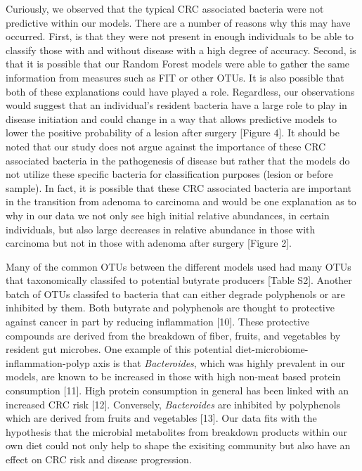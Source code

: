 \documentclass[12pt,]{article}
\begin{document}
Curiously, we observed that the typical CRC associated bacteria were not
predictive within our models. There are a number of reasons why this may
have occurred. First, is that they were not present in enough
individuals to be able to classify those with and without disease with a
high degree of accuracy. Second, is that it is possible that our Random
Forest models were able to gather the same information from measures
such as FIT or other OTUs. It is also possible that both of these
explanations could have played a role. Regardless, our observations
would suggest that an individual's resident bacteria have a large role
to play in disease initiation and could change in a way that allows
predictive models to lower the positive probability of a lesion after
surgery {[}Figure 4{]}. It should be noted that our study does not argue
against the importance of these CRC associated bacteria in the
pathogenesis of disease but rather that the models do not utilize these
specific bacteria for classification purposes (lesion or before sample).
In fact, it is possible that these CRC associated bacteria are important
in the transition from adenoma to carcinoma and would be one explanation
as to why in our data we not only see high initial relative abundances,
in certain individuals, but also large decreases in relative abundance
in those with carcinoma but not in those with adenoma after surgery
{[}Figure 2{]}.

Many of the common OTUs between the different models used had many OTUs
that taxonomically classifed to potential butyrate producers {[}Table
S2{]}. Another batch of OTUs classifed to bacteria that can either
degrade polyphenols or are inhibited by them. Both butyrate and
polyphenols are thought to protective against cancer in part by reducing
inflammation {[}10{]}. These protective compounds are derived from the
breakdown of fiber, fruits, and vegetables by resident gut microbes. One
example of this potential diet-microbiome-inflammation-polyp axis is
that \emph{Bacteroides}, which was highly prevalent in our models, are
known to be increased in those with high non-meat based protein
consumption {[}11{]}. High protein consumption in general has been
linked with an increased CRC risk {[}12{]}. Conversely,
\emph{Bacteroides} are inhibited by polyphenols which are derived from
fruits and vegetables {[}13{]}. Our data fits with the hypothesis that
the microbial metabolites from breakdown products within our own diet
could not only help to shape the exisiting community but also have an
effect on CRC risk and disease progression.
\end{document}
